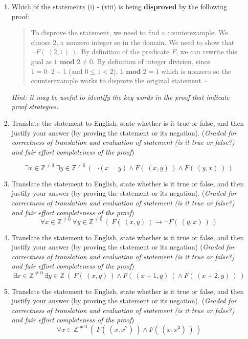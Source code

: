 \documentclass[12pt, oneside]{article}
\begin{document}
\begin{enumerate}[labelindent=0pt, leftmargin=0pt]
\begin{enumerate}
    \item
    Which of the statements (i) - (viii) is being {\bf disproved} by the following proof:
    
    \begin{quote}
      To disprove the statement, we need to find a counterexample. We choose $2$, a nonzero
      integer so in the domain. We need to show that $\lnot F(~(2,1)~)$. By definition of the predicate $F$, we 
      can rewrite this goal as $1 \textbf{ mod } 2 \neq 0$. By definition of integer division, since 
      $1 = 0 \cdot 2  + 1$ (and $0 \leq 1 < 2$), $1 \textbf { mod } 2 = 1$ which is nonzero so the counterexample works to 
      disprove the original statement.
       $\square$
    \end{quote}
    
    {\it Hint: it may be useful to 
    identify the key words in the proof that indicate proof strategies.}
    
    \item 
    Translate the statement to English, state whether is it true or false, and then justify your answer (by proving the statement or its negation).
({\it Graded for correctness of translation and evaluation of statement (is it true or false?) 
    and fair effort completeness of the proof}) 

    $$\exists x \in \mathbb{Z}^{\neq 0}~ \exists y \in \mathbb{Z}^{\neq 0} ~(~\lnot(x = y) \land F(~(x,y)~) \land F(~(y,x)~)~)$$
    
    \item 
    Translate the statement to English, state whether is it true or false, and then justify your answer (by proving the statement or its negation).
    ({\it Graded for correctness of translation and evaluation of statement (is it true or false?) 
    and fair effort completeness of the proof}) 
    $$\forall x \in \mathbb{Z}^{\neq 0}~ \forall y \in \mathbb{Z}^{\neq 0} ~(~F(~(x,y)~) \to \lnot F(~(y,x)~)~)$$
    
    \item 
    Translate the statement to English, state whether is it true or false, and then justify your answer (by proving the statement or its negation)
    ({\it Graded for correctness of translation and evaluation of statement (is it true or false?) 
    and fair effort completeness of the proof}) 
    $$\exists x \in \mathbb{Z}^{\neq 0}~ \exists y \in \mathbb{Z}~(~F(~(x,y)~) \land  F(~(x+1, y)~) \land F(~(x+2, y)~)~)$$
    
    \item 
    Translate the statement to English, state whether is it true or false, and then justify your answer (by proving the statement or its negation).
    ({\it Graded for correctness of translation and evaluation of statement (is it true or false?) 
    and fair effort completeness of the proof}) 
    $$\forall x \in \mathbb{Z}^{\neq 0}~ (~F(~(x,x^2)~) \land F(~(x,x^3)~)~)$$
    

\end{enumerate}
\end{enumerate}
\end{document}

